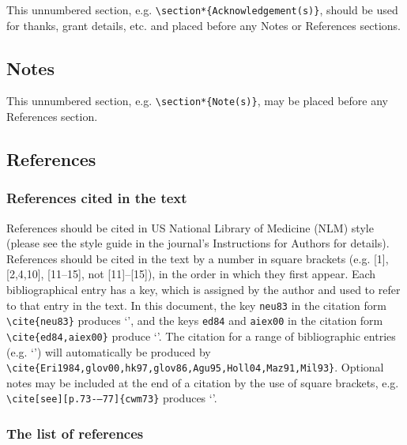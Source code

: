 \documentclass{tADR2e}
\begin{document}
This unnumbered section, e.g. \verb"\section*{Acknowledgement(s)}", should be used for thanks, grant details, etc.
and placed before any Notes or References sections.

\subsection{Notes}

This unnumbered section, e.g. \verb"\section*{Note(s)}", may be placed before any References section.


\subsection{References}\label{refs}

\subsubsection{References cited in the text}

References should be cited in US National Library of Medicine (NLM) style (please see the style guide in the journal's Instructions for Authors for details). References should be cited in the text by a number in square brackets (e.g. [1], [2,4,10], [11--15], not [11]--[15]), in the order in which they first appear. Each bibliographical entry has a key, which is assigned by the author and used to refer to that entry in the text. In this document, the key \verb"neu83" in the citation form \verb"\cite{neu83}" produces `\cite{neu83}', and the keys \verb"ed84" and \verb"aiex00" in the citation form
\verb"\cite{ed84,aiex00}" produce `\cite{ed84,aiex00}'. The citation for a range of bibliographic entries (e.g.
`\cite{Eri1984,glov00,hk97,glov86,Agu95,Holl04,Maz91,Mil93}') will automatically be produced by
\verb"\cite{Eri1984,glov00,hk97,glov86,Agu95,Holl04,Maz91,Mil93}". Optional notes may be included at the end of a citation by the use of square brackets, e.g. \verb"\cite[see][p.73-–77]{cwm73}" produces `\cite[see][p.73--77]{cwm73}'.


\subsubsection{The list of references}
\end{document}
